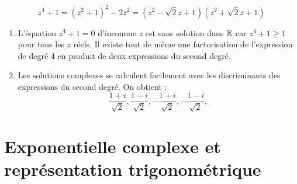 \begin{exple}
 \begin{displaymath}
  z^4 + 1 = (z^2+1)^2 - 2z^2 = (z^2-\sqrt{2}z +1)(z^2+\sqrt{2}z +1)
 \end{displaymath}
\end{exple}
\begin{rems}
\begin{enumerate}
 \item L'équation $z^4+1=0$ d'inconnue $z$ est sans solution dans $\mathbb{R}$ car $z^4+1\geq 1$ pour tous les $z$ réels. Il existe tout de même une factorisation de l'expression de degré $4$ en produit de deux expressions du second  degré.
 \item Les solutions complexes se calculent facilement avec les discriminants des expressions du second degré. On obtient : 
\begin{displaymath}
 \frac{1+i}{\sqrt{2}}, \frac{1-i}{\sqrt{2}}, -\frac{1+i}{\sqrt{2}}, -\frac{1-i}{\sqrt{2}},  
\end{displaymath}

\end{enumerate}
 
\end{rems}

\section{Exponentielle complexe et représentation trigonométrique}
